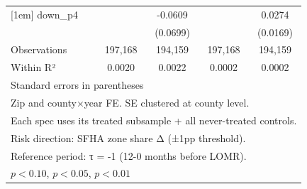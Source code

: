 \begin{table}[htbp]
\begin{tabular}{l*{4}{c}}
[1em]
down\_p4             &                     &     -0.0609         &                     &      0.0274         \\
                    &                     &    (0.0699)         &                     &    (0.0169)         \\
\hline
Observations        &     197,168         &     194,159         &     197,168         &     194,159         \\
Within R²           &      0.0020         &      0.0022         &      0.0002         &      0.0002         \\
\hline\hline
\multicolumn{5}{l}{\footnotesize Standard errors in parentheses}\\
\multicolumn{5}{l}{\footnotesize Zip and county×year FE. SE clustered at county level.}\\
\multicolumn{5}{l}{\footnotesize Each spec uses its treated subsample + all never-treated controls.}\\
\multicolumn{5}{l}{\footnotesize Risk direction: SFHA zone share Δ (±1pp threshold).}\\
\multicolumn{5}{l}{\footnotesize Reference period: τ = -1 (12-0 months before LOMR).}\\
\multicolumn{5}{l}{\footnotesize \sym{*} \(p<0.10\), \sym{**} \(p<0.05\), \sym{***} \(p<0.01\)}\\
\end{tabular}
\end{table}
